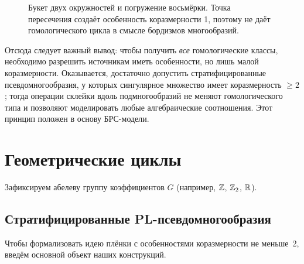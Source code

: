 \documentclass[12pt, twoside]{article}
\begin{document}
\begin{figure}[ht]
\centering
{}
\caption{Букет двух окружностей и погружение восьмёрки. Точка пересечения создаёт особенность коразмерности 1, поэтому не даёт гомологического цикла в смысле бордизмов многообразий.}
\label{fig:bouquet}
\end{figure}

Отсюда следует важный вывод: чтобы получить \emph{все} гомологические классы, необходимо разрешить источникам иметь особенности, но лишь малой коразмерности. Оказывается, достаточно допустить стратифицированные псевдомногообразия, у которых сингулярное множество имеет коразмерность $\ge 2$; тогда операции склейки вдоль подмногообразий не меняют гомологического типа и позволяют моделировать любые алгебраические соотношения. Этот принцип положен в основу БРС-модели.

\section{Геометрические циклы}

Зафиксируем абелеву группу коэффициентов $G$ (например, $\mathbb Z$, $\mathbb Z_2$, $\mathbb R$).

\subsection{Стратифицированные PL-псевдомногообразия}

Чтобы формализовать идею плёнки с особенностями коразмерности не меньше~2, введём основной объект наших конструкций.
\end{document}
